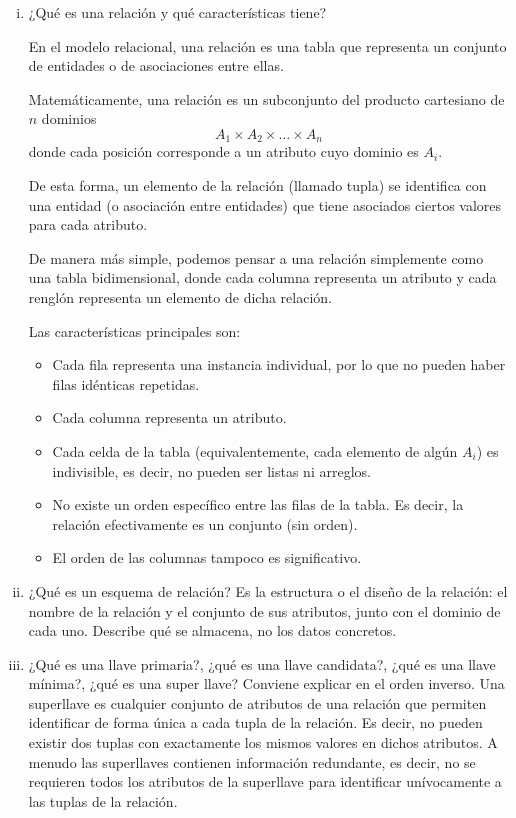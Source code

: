 \begin{enumerate}[i.]
	\item ¿Qué es una relación y qué características tiene?

	      En el modelo relacional, una relación es una tabla que representa un conjunto de entidades o de asociaciones entre ellas.

	      Matemáticamente, una relación es un subconjunto del producto cartesiano de $n$ dominios \[A_1 \times A_2 \times \dots \times A_n\]
	      donde cada posición corresponde a un atributo cuyo dominio es $A_i$.

	      De esta forma, un elemento de la relación (llamado tupla) se identifica con una entidad (o asociación entre entidades) que tiene asociados ciertos valores para cada atributo.


	      De manera más simple, podemos pensar a una relación simplemente como una tabla bidimensional, donde cada columna representa un atributo y cada renglón representa un elemento de dicha relación.

	      Las características principales son:
	      \begin{itemize}
		      \item Cada fila representa una instancia individual, por lo que no pueden haber filas idénticas repetidas.

		      \item Cada columna representa un atributo.
		      \item Cada celda de la tabla (equivalentemente, cada elemento de algún $A_i$) es indivisible, es decir, no pueden ser listas ni arreglos.
		      \item No existe un orden específico entre las filas de la tabla. Es decir, la relación efectivamente es un conjunto (sin orden).
		      \item El orden de las columnas tampoco es significativo.

	      \end{itemize}



	\item ¿Qué es un esquema de relación?
	      Es la estructura o el diseño de la relación: el nombre de la relación y el conjunto de sus atributos, junto con el dominio de cada uno. Describe qué se almacena, no los datos concretos.



	\item ¿Qué es una llave primaria?, ¿qué es una llave candidata?, ¿qué es una llave mínima?, ¿qué es una super llave?
	      Conviene explicar en el orden inverso.
	      Una superllave es cualquier conjunto de atributos de una relación que permiten identificar de forma única a cada tupla de la relación. Es decir, no pueden existir dos tuplas con exactamente los mismos valores en dichos atributos.
	      A menudo las superllaves contienen información redundante, es decir, no se requieren todos los atributos de la superllave para identificar unívocamente a las tuplas de la relación.


\end{enumerate}
